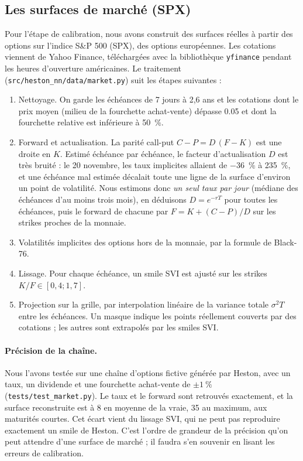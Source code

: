 \subsection{Les surfaces de marché (SPX)}
\label{sec-spx}

Pour l'étape de calibration, nous avons construit des surfaces réelles à partir des options sur l'indice S\&P 500
(SPX), des options européennes. Les cotations viennent de Yahoo Finance, téléchargées avec la bibliothèque
\texttt{yfinance} pendant les heures d'ouverture américaines. Le traitement (\texttt{src/heston\_nn/data/market.py})
suit les étapes suivantes :
\begin{enumerate}
  \item Nettoyage. On garde les échéances de 7 jours à 2,6 ans et les cotations dont le prix moyen
  (milieu de la fourchette achat-vente) dépasse \num{0.05} et dont la fourchette relative est inférieure à
  \SI{50}{\percent}.
  \item Forward et actualisation. La parité call-put $C - P = D\,(F - K)$ est une droite en $K$. Estimé
  échéance par échéance, le facteur d'actualisation $D$ est très bruité : le 20 novembre, les taux implicites
  allaient de \SI{-36}{\percent} à \SI{235}{\percent}, et une échéance mal estimée décalait toute une ligne de la
  surface d'environ un point de volatilité. Nous estimons donc \emph{un seul taux par jour} (médiane des échéances
  d'au moins trois mois), en déduisons $D = e^{-rT}$ pour toutes les échéances, puis le forward de chacune par
  $F = K + (C-P)/D$ sur les strikes proches de la monnaie.
  \item Volatilités implicites des options hors de la monnaie, par la formule de Black-76.
  \item Lissage. Pour chaque échéance, un smile SVI \citep{gatheral2014} est ajusté sur les strikes
  $K/F \in [0{,}4 ; 1{,}7]$.
  \item Projection sur la grille, par interpolation linéaire de la variance totale $\sigma^2 T$ entre les
  échéances. Un masque indique les points réellement couverts par des cotations ; les autres sont extrapolés
  par les smiles SVI.
\end{enumerate}

\paragraph{Précision de la chaîne.} Nous l'avons testée sur une chaîne d'options fictive générée par Heston, avec un
taux, un dividende et une fourchette achat-vente de $\pm\SI{1}{\percent}$ (\texttt{tests/test\_market.py}). Le
taux et le forward sont retrouvés exactement, et la surface reconstruite est à \SI{8}{\pb} en moyenne de la vraie,
\SI{35}{\pb} au maximum, aux maturités courtes. Cet écart vient du lissage SVI, qui ne peut pas reproduire
exactement un smile de Heston. C'est l'ordre de grandeur de la précision qu'on peut attendre d'une surface de
marché ; il faudra s'en souvenir en lisant les erreurs de calibration.

